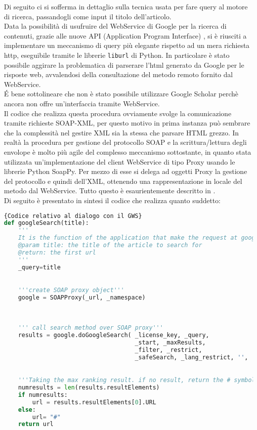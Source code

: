 Di seguito ci si sofferma in dettaglio sulla tecnica usata per fare query al motore di ricerca, passandogli come input il titolo dell'articolo.
\\ 
Data la possibilità di usufruire del WebService di Google per la ricerca di contenuti, grazie alle nuove API (Application Program Interface) \cite{GWS}, si è riusciti a implementare un meccanismo di query più elegante rispetto ad un mera richiesta http, eseguibile tramite le librerie \texttt{liburl} di Python. In particolare è stato possibile aggirare la problematica di parserare l'html generato da Google per le risposte web, avvalendosi della consultazione del metodo remoto fornito dal WebService.
\\
\'E bene sottolineare che non è stato possibile utilizzare Google Scholar perchè ancora non offre un'interfaccia  tramite WebService.
\\
Il codice che realizza questa procedura ovviamente svolge la comunicazione tramite richieste SOAP-XML, per questo motivo in prima instanza può sembrare che la complessità nel gestire XML sia la stessa che parsare HTML grezzo. In realtà la procedura per gestione del protocollo SOAP e la scrittura/lettura degli envolope è molto più agile del complesso meccanismo sottostante, in quanto stata utilizzata un'implementazione del client WebService di tipo Proxy usando le librerie Python SoapPy. Per mezzo di esse si delega ad oggetti Proxy la gestione del protocollo e quindi dell'XML, ottenendo una rappresentazione in locale del metodo dal WebService. Tutto questo è esaurientemente descritto in \cite{ibm-py-ws}.
\\
Di seguito è presentato in sintesi il codice che realizza quanto suddetto:

\begin{lstlisting}[language=Python,frame=r,caption=Codice relativo al dialogo con il GWS ,breaklines=true,basicstyle=\scriptsize]{Codice relativo al dialogo con il GWS}
def googleSearch(title):
    '''
    It is the function of the application that make the request at google WS using SoapPY getting the first url of response.    
    @param title: the title of the article to search for
    @return: the first url
    '''
    _query=title

    
    '''create SOAP proxy object'''
    google = SOAPProxy(_url, _namespace)
    

    
    ''' call search method over SOAP proxy'''
    results = google.doGoogleSearch( _license_key, _query, 
                                     _start, _maxResults, 
                                     _filter, _restrict,
                                     _safeSearch, _lang_restrict, '', '' )

    
    '''Taking the max ranking result. if no result, return the # symbol'''                                                       
    numresults = len(results.resultElements)
    if numresults:
        url = results.resultElements[0].URL
    else:
        url= "#"
    return url
    
\end{lstlisting}


